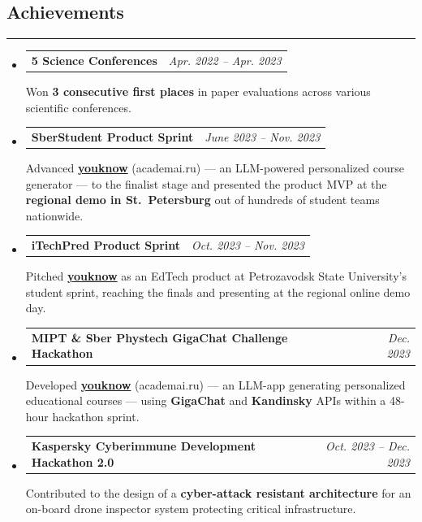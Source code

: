 \documentclass[11pt,letterpaper]{article}
\makeatletter
\newcommand{\headerrow}[2]
{\begin{tabular*}{\linewidth}{l@{\extracolsep{\fill}}r}
#1 & #2 \\
\end{tabular*}}
\makeatother
\begin{document}
\subsection*{\Large Achievements}
\vspace{-0.5em}
\hrule
\vspace{0.3em}

\begin{itemize}[leftmargin=0em, itemsep=0.4em]
    \parskip=0.1em
    \renewcommand\labelitemi{}

    \item
    \headerrow
        {\textbf{5 Science Conferences}}
        {\emph{Apr. 2022 -- Apr. 2023}}
    Won \textbf{3 consecutive first places} in paper evaluations across various scientific conferences.

    \item
    \headerrow
        {\textbf{SberStudent Product Sprint}}
        {\emph{June 2023 -- Nov. 2023}}
    Advanced \href{https://youknow.academai.ru}{\textbf{youknow}} (academai.ru) --- an LLM-powered personalized course generator --- to the finalist stage and presented the product MVP at the \textbf{regional demo in St.\ Petersburg} out of hundreds of student teams nationwide.

    \item
    \headerrow
        {\textbf{iTechPred Product Sprint}}
        {\emph{Oct. 2023 -- Nov. 2023}}
    Pitched \href{https://youknow.academai.ru}{\textbf{youknow}} as an EdTech product at Petrozavodsk State University's student sprint, reaching the finals and presenting at the regional online demo day.

    \item
    \headerrow
        {\textbf{MIPT \& Sber Phystech GigaChat Challenge Hackathon}}
        {\emph{Dec. 2023}}
    Developed \href{https://youknow.academai.ru}{\textbf{youknow}} (academai.ru) --- an LLM-app generating personalized educational courses --- using \textbf{GigaChat} and \textbf{Kandinsky} APIs within a 48-hour hackathon sprint.

    \item
    \headerrow
        {\textbf{Kaspersky Cyberimmune Development Hackathon 2.0}}
        {\emph{Oct. 2023 -- Dec. 2023}}
    Contributed to the design of a \textbf{cyber-attack resistant architecture} for an on-board drone inspector system protecting critical infrastructure.

\end{itemize}
\end{document}
